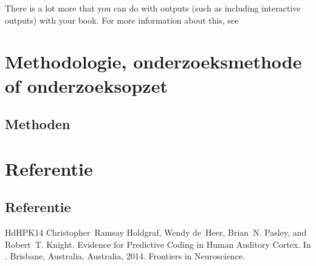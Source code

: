 \documentclass[letterpaper,10pt,english]{jupyterBook}
\begin{document}
\begin{sphinxVerbatim}[commandchars=\\\{\}]
    
  
 \PYG{p}{[}  \PYG{p}{]}
\end{sphinxVerbatim}

\noindent{}

\sphinxAtStartPar
There is a lot more that you can do with outputs (such as including interactive outputs)
with your book. For more information about this, see 


\part{Methodologie, onderzoeksmethode of onderzoeksopzet}


\chapter{Methoden}
\label{\detokenize{methoden:methoden}}\label{\detokenize{methoden::doc}}

\part{Referentie}


\chapter{Referentie}
\label{\detokenize{referentie:referentie}}\label{\detokenize{referentie::doc}}
\begin{sphinxthebibliography}{HdHPK14}
\sphinxAtStartPar
Christopher Ramsay Holdgraf, Wendy de Heer, Brian N. Pasley, and Robert T. Knight. Evidence for Predictive Coding in Human Auditory Cortex. In . Brisbane, Australia, Australia, 2014. Frontiers in Neuroscience.
\end{sphinxthebibliography}







\renewcommand{\indexname}{Index}
\printindex
\end{document}
